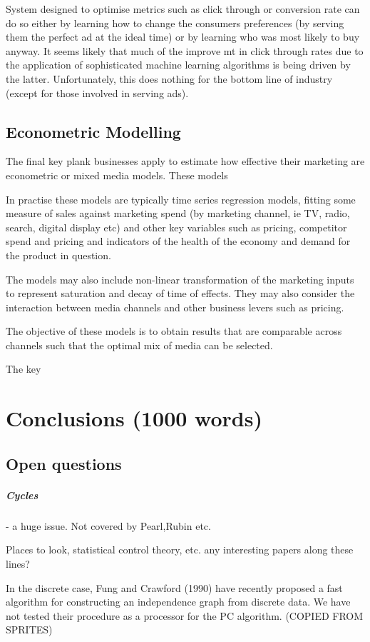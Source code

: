 \documentclass[11pt,a4paper,oneside]{book}
\theoremstyle{plain}
\theoremstyle{definition}
\begin{document}
System designed to optimise metrics such as click through or conversion rate can do so either by learning how to change the consumers preferences (by serving them the perfect ad at the ideal time) or by learning who was most likely to buy anyway. It seems likely that much of the improve mt in click through rates due to the application of sophisticated machine learning algorithms is being driven by the latter. Unfortunately, this does nothing for the bottom line of industry (except for those involved in serving ads). 


\section{Econometric Modelling}
The final key plank businesses apply to estimate how effective their marketing are econometric or mixed media models. These models

In practise these models are typically time series regression models, fitting some measure of sales against marketing spend (by marketing channel, ie TV, radio, search, digital display etc) and other key variables such as pricing, competitor spend and pricing and indicators of the health of the economy and demand for the product in question.

The models may also include non-linear transformation of the marketing inputs to represent saturation and decay of time of effects. They may also consider the interaction between media channels and other business levers such as pricing.  

The objective of these models is to obtain results that are comparable across channels such that the optimal mix of media can be selected. 

The key

\chapter{Conclusions (1000 words)}

\section{Open questions}
\paragraph{Cycles} - a huge issue. Not covered by Pearl,Rubin etc. 

Places to look, statistical control theory, etc. any interesting papers along these lines?

In the discrete case,
Fung and Crawford (1990) have recently proposed a fast algorithm for constructing an
independence graph from discrete data. We have not tested their procedure as a processor for
the PC algorithm. (COPIED FROM SPRITES)


\end{document}
